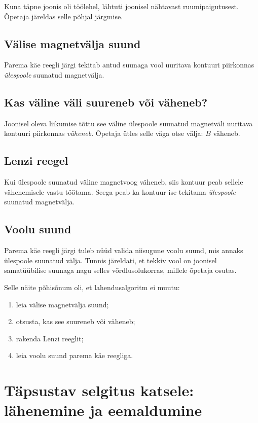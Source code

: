 \documentclass[a4paper,11pt]{article}
\begin{document}
Kuna täpne joonis oli töölehel, lähtuti joonisel nähtavast ruumipaigutusest. Õpetaja järeldas selle põhjal järgmise.

\subsection{Välise magnetvälja suund}

Parema käe reegli järgi tekitab antud suunaga vool uuritava kontuuri piirkonnas \emph{ülespoole} suunatud magnetvälja.

\subsection{Kas väline väli suureneb või väheneb?}

Joonisel oleva liikumise tõttu see väline ülespoole suunatud magnetväli uuritava kontuuri piirkonnas \emph{väheneb}. Õpetaja ütles selle väga otse välja: \(B\) väheneb.

\subsection{Lenzi reegel}

Kui ülespoole suunatud väline magnetvoog väheneb, siis kontuur peab sellele vähenemisele vastu töötama. Seega peab ka kontuur ise tekitama \emph{ülespoole} suunatud magnetvälja.

\subsection{Voolu suund}

Parema käe reegli järgi tuleb nüüd valida niisugune voolu suund, mis annaks ülespoole suunatud välja. Tunnis järeldati, et tekkiv vool on joonisel samatüübilise suunaga nagu selles võrdlusolukorras, millele õpetaja osutas.

Selle näite põhisõnum oli, et lahendusalgoritm ei muutu:

\begin{enumerate}
    \item leia välise magnetvälja suund;
    \item otsusta, kas see suureneb või väheneb;
    \item rakenda Lenzi reeglit;
    \item leia voolu suund parema käe reegliga.
\end{enumerate}

\section{Täpsustav selgitus katsele: lähenemine ja eemaldumine}
\end{document}

